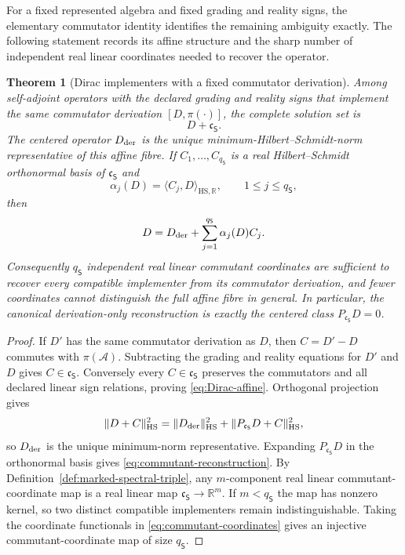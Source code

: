 \documentclass[11pt]{article}
\newtheorem{theorem}{Theorem}[section]
\theoremstyle{definition}
\theoremstyle{remark}
\theoremstyle{definition}
\theoremstyle{remark}
\newcommand{\R}{\mathbb R}
\newcommand{\A}{\mathcal A}
\newcommand{\HS}{\mathrm{HS}}
\begin{document}
For a fixed represented algebra and fixed grading and reality signs, the elementary
commutator identity identifies the remaining ambiguity exactly.  The following
statement records its affine structure and the sharp number of independent
real linear coordinates needed to recover the operator.

\begin{theorem}[Dirac implementers with a fixed commutator derivation]
\label{thm:commutant-fibre}
Among self-adjoint operators with the declared grading and reality signs that
implement the same commutator derivation $[D,\pi(\cdot)]$, the complete solution
set is
\begin{equation}
 D+\mathfrak c_{\mathsf S}.
 \label{eq:Dirac-affine}
\end{equation}
The centered operator $D_{\rm der}$ is the unique minimum-Hilbert--Schmidt-norm
representative of this affine fibre.  If
$C_1,\ldots,C_{q_{\mathsf S}}$ is a real Hilbert--Schmidt orthonormal basis of
$\mathfrak c_{\mathsf S}$ and
\begin{equation}
 \alpha_j(D)=\langle C_j,D\rangle_{\HS,\R},
 \qquad 1\le j\le q_{\mathsf S},
 \label{eq:commutant-coordinates}
\end{equation}
then
\begin{equation}
 D=D_{\rm der}
   +\sum_{j=1}^{q_{\mathsf S}}\alpha_j(D)C_j.
 \label{eq:commutant-reconstruction}
\end{equation}
Consequently $q_{\mathsf S}$ independent real linear commutant coordinates are sufficient to
recover every compatible implementer from its commutator derivation, and fewer
coordinates cannot distinguish the full affine fibre in general.  In particular, the
canonical derivation-only reconstruction is exactly the centered class
$P_{\mathfrak c_{\mathsf S}}D=0$.
\end{theorem}

\begin{proof}
If $D'$ has the same commutator derivation as $D$, then $C=D'-D$ commutes with
$\pi(\A)$.  Subtracting the grading and reality equations for $D'$ and $D$ gives
$C\in\mathfrak c_{\mathsf S}$.  Conversely every
$C\in\mathfrak c_{\mathsf S}$ preserves the commutators and all declared linear
sign relations, proving \eqref{eq:Dirac-affine}.  Orthogonal projection gives
\[
 \|D+C\|_{\HS}^2
 =\|D_{\rm der}\|_{\HS}^2
  +\|P_{\mathfrak c_{\mathsf S}}D+C\|_{\HS}^2,
\]
so $D_{\rm der}$ is the unique minimum-norm representative.  Expanding
$P_{\mathfrak c_{\mathsf S}}D$ in the orthonormal basis gives
\eqref{eq:commutant-reconstruction}.  By Definition~\ref{def:marked-spectral-triple}, any $m$-component real linear commutant-coordinate map is a
real linear map $\mathfrak c_{\mathsf S}\to\R^m$.  If
$m<q_{\mathsf S}$ the map has nonzero kernel, so two distinct compatible
implementers remain indistinguishable.  Taking the coordinate functionals in
\eqref{eq:commutant-coordinates} gives an injective commutant-coordinate map of size $q_{\mathsf S}$.
\end{proof}
\end{document}
